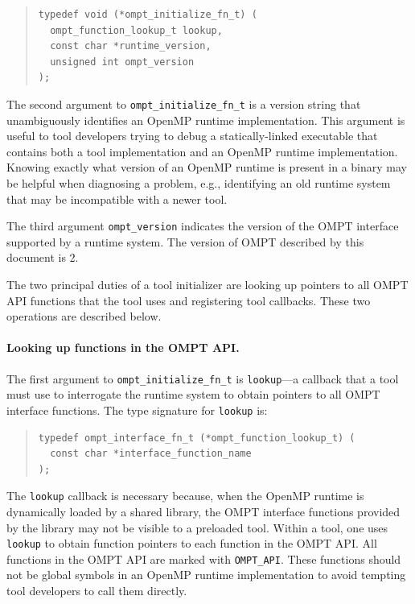 \documentclass{article}
\begin{document}
\begin{quote}
\begin{verbatim}
typedef void (*ompt_initialize_fn_t) (
  ompt_function_lookup_t lookup,
  const char *runtime_version, 
  unsigned int ompt_version
);
\end{verbatim}
\end{quote}
The second argument to  \verb|ompt_initialize_fn_t| is a version string that unambiguously identifies an OpenMP runtime implementation. This argument is useful to tool developers trying to debug a statically-linked executable that contains both a tool implementation and an OpenMP runtime implementation. Knowing exactly what version of an OpenMP runtime is present in a binary may be helpful when diagnosing a problem, e.g., identifying an old runtime system that may be incompatible with a newer tool.

The third argument \verb|ompt_version| indicates the version of the OMPT interface supported by a runtime system.
The version of OMPT described by this document is 2.

The two principal duties of a tool initializer are looking up pointers to all OMPT API functions that the tool uses and registering tool callbacks.  These two operations are described below.

\paragraph{Looking up functions in the OMPT API.} The first argument to \verb|ompt_initialize_fn_t| is \verb|lookup|---a callback that a tool must use to interrogate the runtime system to obtain pointers to all OMPT interface functions.
The type signature for  \verb|lookup| is:

\begin{quote}
\begin{verbatim}
typedef ompt_interface_fn_t (*ompt_function_lookup_t) (
  const char *interface_function_name
);
\end{verbatim}
\end{quote}

\noindent
The \verb|lookup| callback is necessary because, when the OpenMP runtime is dynamically loaded by a shared library, the OMPT interface functions provided by the library may not be visible to a preloaded tool. Within a tool, one uses \verb|lookup| to obtain function pointers to each function in the OMPT API.  All functions in the OMPT API are marked with \verb|OMPT_API|. These functions should not be global symbols in an OpenMP runtime implementation to avoid tempting tool developers to call them directly. 
\end{document}
